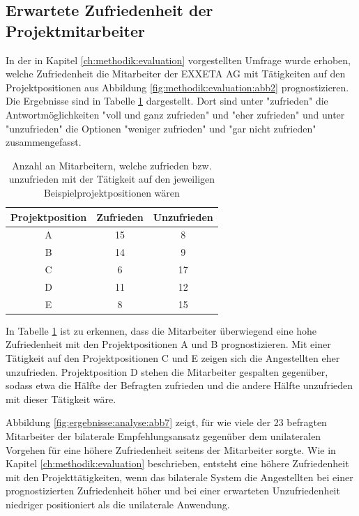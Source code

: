 \subsection{Erwartete Zufriedenheit der Projektmitarbeiter}
\label{ch:ergebnisse:fallstudie:umfrageMitarbeiter}
In der in Kapitel \ref{ch:methodik:evaluation} vorgestellten Umfrage wurde erhoben, welche Zufriedenheit die Mitarbeiter der EXXETA AG mit Tätigkeiten auf den Projektpositionen aus Abbildung \ref{fig:methodik:evaluation:abb2} prognostizieren. Die Ergebnisse sind in Tabelle \ref{tbl:ergebnisse:umfrageMitarbeiter:zufriedenheit:tbl1} dargestellt. Dort sind unter "zufrieden" die Antwortmöglichkeiten "voll und ganz zufrieden" und "eher zufrieden" und unter "unzufrieden" die Optionen "weniger zufrieden" und "gar nicht zufrieden" zusammengefasst.

\begin{table}[h]
	\centering
	\begin{tabular}{c|c|c}
		\textbf{Projektposition} & \textbf{Zufrieden} & \textbf{Unzufrieden}\\ 
		\hline
		A & 15 & 8\\
		B & 14 & 9\\
		C & 6  & 17\\
		D & 11 & 12\\
		E & 8  & 15
	\end{tabular}
	\caption{Anzahl an Mitarbeitern, welche zufrieden bzw. unzufrieden mit der Tätigkeit auf den jeweiligen Beispielprojektpositionen wären}
	\label{tbl:ergebnisse:umfrageMitarbeiter:zufriedenheit:tbl1}
\end{table}

In Tabelle \ref{tbl:ergebnisse:umfrageMitarbeiter:zufriedenheit:tbl1} ist zu erkennen, dass die Mitarbeiter überwiegend eine hohe Zufriedenheit mit den Projektpositionen A und B prognostizieren. Mit einer Tätigkeit auf den Projektpositionen C und E zeigen sich die Angestellten eher unzufrieden. Projektposition D stehen die Mitarbeiter gespalten gegenüber, sodass etwa die Hälfte der Befragten zufrieden und die andere Hälfte unzufrieden mit dieser Tätigkeit wäre.

Abbildung \ref{fig:ergebnisse:analyse:abb7} zeigt, für wie viele der 23 befragten Mitarbeiter der bilaterale Empfehlungsansatz gegenüber dem unilateralen Vorgehen für eine höhere Zufriedenheit seitens der Mitarbeiter sorgte. Wie in Kapitel \ref{ch:methodik:evaluation} beschrieben, entsteht eine höhere Zufriedenheit mit den Projekttätigkeiten, wenn das bilaterale System die Angestellten bei einer prognostizierten Zufriedenheit höher und bei einer erwarteten Unzufriedenheit niedriger positioniert als die unilaterale Anwendung.

